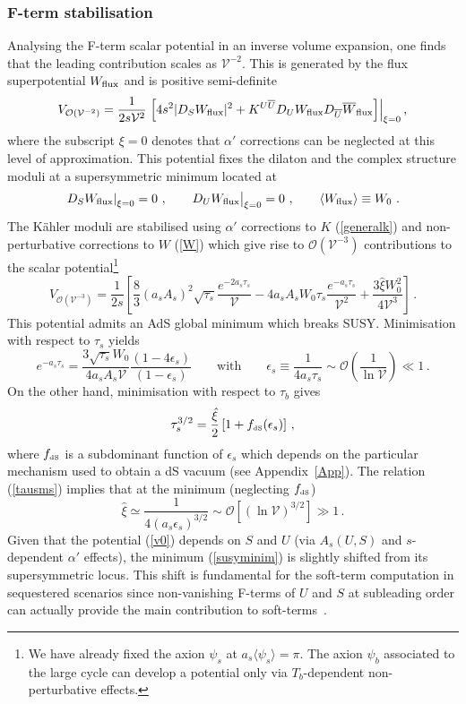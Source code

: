 \documentclass[11pt,a4paper]{article}
\newcommand{\be}{\begin{equation}}
\newcommand{\ee}{\end{equation}}
\def\dS{{\scriptscriptstyle \rm dS}}
\newcommand\vo{{\mathcal{V}}}
\newcommand{\mc}{\mathcal}
\begin{document}
\subsubsection{F-term stabilisation}

Analysing the F-term scalar potential in an inverse volume expansion, one finds that the leading contribution scales as $\vo^{-2}$.
This is generated by the flux superpotential $W_{\rm flux}$ and is positive semi-definite
\be
\label{vddilaton}
V_{\mc{O}({\vo}^{-2})} = \frac{1}{2 s\vo^2} \left.\left[4 s^2 |D_S W_{\rm flux}|^2
+ K^{U \overline{U}} D_U W_{\rm flux} D_{\overline{U}} \overline{W}_{\rm flux}\right]\right|_{\xi=0},
\ee
where the subscript $\xi = 0$ denotes that $\alpha'$ corrections can be neglected at this level of approximation.
This potential fixes the dilaton and the complex structure moduli at a supersymmetric minimum located at
\be
\label{susyminim}
\left.D_S W_{\rm flux}\right|_{\xi  = 0} = 0\ , \qquad D_U W_{\rm flux} \big{|}_{\xi = 0} = 0\ , \qquad \langle W_{\rm flux}\rangle\equiv W_0\ .
\ee
The K\"ahler moduli are stabilised using $\alpha'$ corrections to $K$ (\ref{generalk})
and non-perturbative corrections to $W$ (\ref{W}) which give rise to $\mc{O}(\vo^{-3})$ contributions
to the scalar potential\footnote{We have already fixed the axion $\psi_s$ at $a_s\langle\psi_s\rangle=\pi$.
The axion $\psi_b$ associated to the large cycle can develop a potential only via $T_b$-dependent non-perturbative effects.}
\be
\label{v0}
V_{\mc{O}({\vo}^{-3})} = \frac{1}{2 s} \left[\frac{8}{3}(a_s A_s)^2 \sqrt{\tau_s} \frac{e^{- 2 a_s \tau_s}}{\vo}
- 4 a_s A_s W_0 \tau_s \frac{e^{-a_s \tau_s}}{\vo^2 } + \frac{3\hat\xi W_0^2}{4\vo^3}\right]\, .
\ee
This potential admits an AdS global minimum which breaks SUSY. Minimisation with respect to $\tau_s$ yields
\be
e^{- a_s \tau_s} = \frac{3 \sqrt{\tau_s} W_0}{4 a_s A_s \vo} \frac{\left(1-4\epsilon_s\right)}{\left(1-\epsilon_s\right)}\qquad\text{with}\qquad \epsilon_s \equiv\frac{1}{4 a_s \tau_s}\sim\mc{O}\left(\frac{1}{\ln\vo}\right)\ll 1\,.
\label{eataus}
\ee
On the other hand, minimisation with respect to $\tau_b$ gives
\be
\tau_s^{3/2} = \frac{\hat\xi}{2} \left[1 + f_\dS(\epsilon_s) \right]\,,
\label{tausms}
\ee
where $f_\dS$ is a subdominant function of $\epsilon_s$ which depends on the particular mechanism used to obtain a dS vacuum (see Appendix~\ref{App}).
The relation (\ref{tausms}) implies that at the minimum (neglecting $f_\dS$)
\be
\hat\xi\simeq \frac{1}{4\left(a_s \epsilon_s\right)^{3/2}}\sim\mc{O}\left[\left(\ln\vo\right)^{3/2}\right] \gg 1\,.
\label{tausms2}
\ee
Given that the potential (\ref{v0}) depends on $S$ and $U$ (via $A_s(U,S)$ and $s$-dependent $\alpha'$ effects),
the minimum (\ref{susyminim}) is slightly shifted from its supersymmetric locus. This shift is fundamental for the soft-term computation
in sequestered scenarios since non-vanishing F-terms of $U$ and $S$ at subleading order
can actually provide the main contribution to soft-terms~\cite{Blumenhagen:2009gk}.
\end{document}
